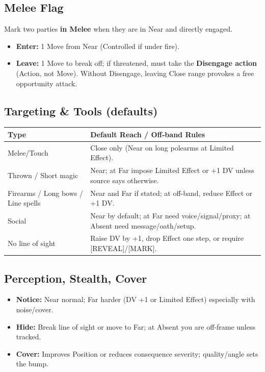 \subsection{Melee Flag}
Mark two parties \textbf{in Melee} when they are in Near and directly engaged.
\begin{itemize}
  \item \textbf{Enter:} 1 Move from Near (Controlled if under fire).
  \item \textbf{Leave:} 1 Move to break off; if threatened, must take the \textbf{Disengage action} (Action, not Move). Without Disengage, leaving Close range provokes a free opportunity attack.
\end{itemize}

\subsection{Targeting \& Tools (defaults)}
\begin{center}
\begin{longtable}{@{}lp{10.5cm}@{}}
\toprule
\textbf{Type} & \textbf{Default Reach / Off‑band Rules} \\
\midrule
Melee/Touch & Close only (Near on long polearms at Limited Effect). \\
Thrown / Short magic & Near; at Far impose Limited Effect or +1 DV unless source says otherwise. \\
Firearms / Long bows / Line spells & Near and Far if stated; at off‑band, reduce Effect or +1 DV. \\
Social & Near by default; at Far need voice/signal/proxy; at Absent need message/oath/setup. \\
No line of sight & Raise DV by +1, drop Effect one step, or require [REVEAL]/[MARK]. \\
\bottomrule
\end{longtable}
\end{center}

\subsection{Perception, Stealth, Cover}
\begin{itemize}
  \item \textbf{Notice:} Near normal; Far harder (DV +1 or Limited Effect) especially with noise/cover.
  \item \textbf{Hide:} Break line of sight or move to Far; at Absent you are off‑frame unless tracked.
  \item \textbf{Cover:} Improves Position or reduces consequence severity; quality/angle sets the bump.
\end{itemize}

